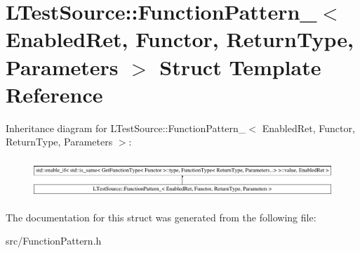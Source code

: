 \hypertarget{struct_l_test_source_1_1_function_pattern__}{\section{L\-Test\-Source\-:\-:Function\-Pattern\-\_\-$<$ Enabled\-Ret, Functor, Return\-Type, Parameters $>$ Struct Template Reference}
\label{struct_l_test_source_1_1_function_pattern__}
}
Inheritance diagram for L\-Test\-Source\-:\-:Function\-Pattern\-\_\-$<$ Enabled\-Ret, Functor, Return\-Type, Parameters $>$\-:\begin{figure}[H]
\begin{center}
\leavevmode
\includegraphics[height=1.458333cm]{struct_l_test_source_1_1_function_pattern__}
\end{center}
\end{figure}


The documentation for this struct was generated from the following file\-:\begin{DoxyCompactItemize}
\item 
src/Function\-Pattern.\-h\end{DoxyCompactItemize}
